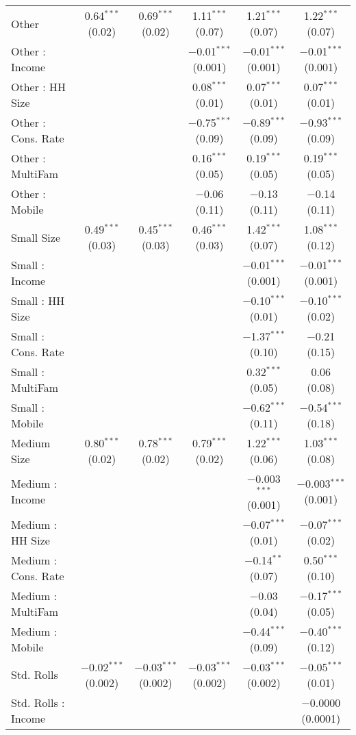 \begin{table}[!htbp]
\begin{tabular}{@{\extracolsep{5pt}}lccccc}
  Other & 0.64$^{***}$ (0.02) & 0.69$^{***}$ (0.02) & 1.11$^{***}$ (0.07) & 1.21$^{***}$ (0.07) & 1.22$^{***}$ (0.07) \\ 
  Other : Income &  &  & $-$0.01$^{***}$ (0.001) & $-$0.01$^{***}$ (0.001) & $-$0.01$^{***}$ (0.001) \\ 
  Other : HH Size &  &  & 0.08$^{***}$ (0.01) & 0.07$^{***}$ (0.01) & 0.07$^{***}$ (0.01) \\ 
  Other : Cons. Rate &  &  & $-$0.75$^{***}$ (0.09) & $-$0.89$^{***}$ (0.09) & $-$0.93$^{***}$ (0.09) \\ 
  Other : MultiFam &  &  & 0.16$^{***}$ (0.05) & 0.19$^{***}$ (0.05) & 0.19$^{***}$ (0.05) \\ 
  Other : Mobile &  &  & $-$0.06 (0.11) & $-$0.13 (0.11) & $-$0.14 (0.11) \\ 
  Small Size & 0.49$^{***}$ (0.03) & 0.45$^{***}$ (0.03) & 0.46$^{***}$ (0.03) & 1.42$^{***}$ (0.07) & 1.08$^{***}$ (0.12) \\ 
  Small : Income &  &  &  & $-$0.01$^{***}$ (0.001) & $-$0.01$^{***}$ (0.001) \\ 
  Small : HH Size &  &  &  & $-$0.10$^{***}$ (0.01) & $-$0.10$^{***}$ (0.02) \\ 
  Small : Cons. Rate &  &  &  & $-$1.37$^{***}$ (0.10) & $-$0.21 (0.15) \\ 
  Small : MultiFam &  &  &  & 0.32$^{***}$ (0.05) & 0.06 (0.08) \\ 
  Small : Mobile &  &  &  & $-$0.62$^{***}$ (0.11) & $-$0.54$^{***}$ (0.18) \\ 
  Medium Size & 0.80$^{***}$ (0.02) & 0.78$^{***}$ (0.02) & 0.79$^{***}$ (0.02) & 1.22$^{***}$ (0.06) & 1.03$^{***}$ (0.08) \\ 
  Medium : Income &  &  &  & $-$0.003$^{***}$ (0.001) & $-$0.003$^{***}$ (0.001) \\ 
  Medium : HH Size &  &  &  & $-$0.07$^{***}$ (0.01) & $-$0.07$^{***}$ (0.02) \\ 
  Medium : Cons. Rate &  &  &  & $-$0.14$^{**}$ (0.07) & 0.50$^{***}$ (0.10) \\ 
  Medium : MultiFam &  &  &  & $-$0.03 (0.04) & $-$0.17$^{***}$ (0.05) \\ 
  Medium : Mobile &  &  &  & $-$0.44$^{***}$ (0.09) & $-$0.40$^{***}$ (0.12) \\ 
  Std. Rolls & $-$0.02$^{***}$ (0.002) & $-$0.03$^{***}$ (0.002) & $-$0.03$^{***}$ (0.002) & $-$0.03$^{***}$ (0.002) & $-$0.05$^{***}$ (0.01) \\ 
  Std. Rolls : Income &  &  &  &  & $-$0.0000 (0.0001) \\ 

\end{tabular}
\end{table}
